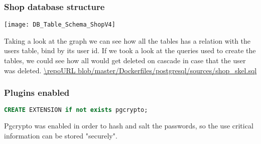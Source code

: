 \newpage
\subsubsection[Shop database structure]{Shop database structure}
\begin{center}
    \texttt{[image: DB\_Table\_Schema\_ShopV4]}
\end{center}
\begin{flushleft}
    Taking a look at the graph we can see how all the tables has a relation with the users table, bind by its user id.
    If we took a look at the queries used to create the tables, we could see how all would get deleted on cascade in case
    that the user was deleted.
    \url{\repoURL blob/master/Dockerfiles/postgresql/sources/shop_skel.sql}
\end{flushleft}


\subsubsection[Plugins enabled]{Plugins enabled}
\begin{lstlisting}[language=SQL,label={lst:pgcrypto_enabling}]
CREATE EXTENSION if not exists pgcrypto;
\end{lstlisting}
\begin{flushleft}
    Pgcrypto was enabled in order to hash and salt the passwords, so the use critical information can be stored "securely".
\end{flushleft}

\newpage
